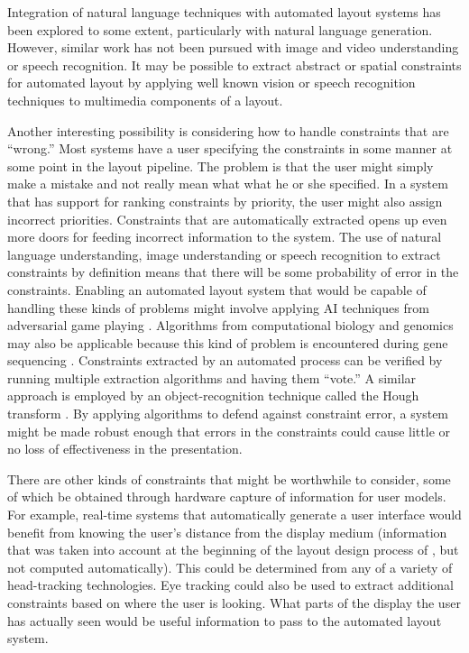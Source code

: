     Integration of natural language techniques with automated layout systems has been explored to some extent, particularly with natural language generation. However, similar work has not been pursued with image and video understanding or speech recognition. It may be possible to extract abstract or spatial constraints for automated layout by applying well known vision or speech recognition techniques to multimedia components of a layout.

    Another interesting possibility is considering how to handle constraints that are “wrong.” Most systems have a user specifying the constraints in some manner at some point in the layout pipeline. The problem is that the user might simply make a mistake and not really mean what what he or she specified. In a system that has support for ranking constraints by priority, the user might also assign incorrect priorities. Constraints that are automatically extracted opens up even more doors for feeding incorrect information to the system. The use of natural language understanding, image understanding or speech recognition to extract constraints by definition means that there will be some probability of error in the constraints. Enabling an automated layout system that would be capable of handling these kinds of problems might involve applying AI techniques from adversarial game playing \citep{nilsson-1}. Algorithms from computational biology and genomics may also be applicable because this kind of problem is encountered during gene sequencing \citep{salzberg-1}. Constraints extracted by an automated process can be verified by running multiple extraction algorithms and having them “vote.” A similar approach is employed by an object-recognition technique called the Hough transform \citep{horn-1}. By applying algorithms to defend against constraint error, a system might be made robust enough that errors in the constraints could cause little or no loss of effectiveness in the presentation.

    There are other kinds of constraints that might be worthwhile to consider, some of which be obtained through hardware capture of information for user models. For example, real-time systems that automatically generate a user interface would benefit from knowing the user’s distance from the display medium (information that was taken into account at the beginning of the layout design process of \citep{feiner-1}, but not computed automatically). This could be determined from any of a variety of head-tracking technologies. Eye tracking could also be used to extract additional constraints based on where the user is looking. What parts of the display the user has actually seen would be useful information to pass to the automated layout system.


